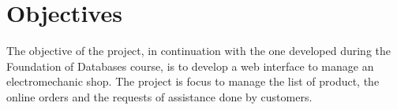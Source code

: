 \section{Objectives}


The objective of the project, in continuation with the one developed during the Foundation of
Databases course, is to develop a web interface to manage an electromechanic shop. The project is focus to manage the list of product, the online orders and the requests of assistance done by customers.